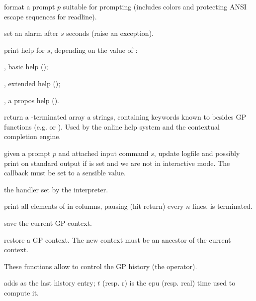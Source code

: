  format a prompt $p$
suitable for  prompting (includes colors and protecting ANSI escape
sequences for readline).

 set an alarm after $s$ seconds (raise an
 exception).

 print help for $s$, depending
on the value of \fl:

\item {}, basic help ();

\item {}, extended help ();

\item {}, a propos help ().

 return a
-terminated array a strings, containing keywords known to
 besides GP functions (e.g.  or ).
Used by the online help system and the contextual completion engine.

 given a prompt
$p$ and attached input command $s$, update logfile and possibly
print on standard output if  is set and we are not in interactive
mode. The callback  must be set to a sensible
value.

 the  handler
set by the  interpreter.

print all elements of  in columns, pausing (hit return)
every $n$ lines.  is  terminated.


 save the current GP
context.

 restore a GP context.
The new context must be an ancestor of the current context.


These functions allow to control the GP history (the \kbd{\%} operator).

 adds  as the last history
entry; $t$ (resp. r) is the cpu (resp. real) time used to compute it.

